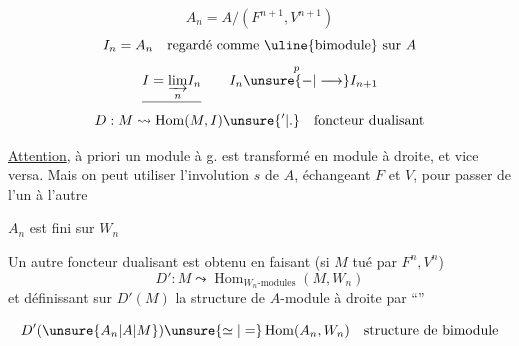 \[
A_n=A/(F^{n+1},V^{n+1})
\]
\[
I_n=A_n\quad\text{regardé comme \uline{bimodule} sur }A
\]
\[
\underline{I=\underset{n}{\varinjlim} I_n}\qquad I_n\overset p{\unsure{\mathord{-}|\longrightarrow}}I_{n+1}
\]
\[
D:M\leadsto\operatorname{Hom}(M,I)\unsure{'|\mathord{.}}\quad\text{foncteur dualisant}
\]

\uline{Attention}, à priori un module à g. est transformé en module à droite, et vice versa. Mais on peut utiliser l'involution $s$ de $A$, échangeant $F$ et $V$, pour passer de l'un à l'autre

\quad $A_n$ est fini sur $W_n$

Un autre foncteur dualisant est obtenu en faisant (si $M$ tué par $F^n,V^n$)
\[
D':M\leadsto\operatorname{Hom}_{W_n\text{-modules}}(M,W_n)
\]
et définissant sur $D'(M)$ la structure de $A$-module à droite par ``''

\[
D'(\unsure{A_n|A|M})\unsure{\simeq|=}\operatorname{Hom}(A_n,W_n)\quad\text{structure de bimodule}
\]

